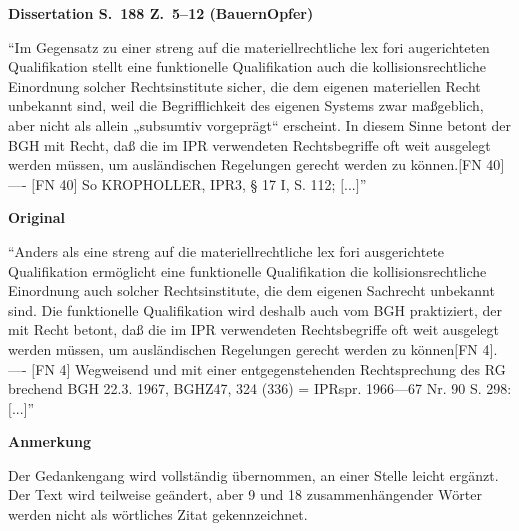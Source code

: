 \documentclass[ngerman,final,fontsize=12pt,paper=a4,twoside,bibliography=totocnumbered,BCOR=8mm,draft=false]{scrartcl}
\newenvironment{fragment}
	{\begin{snugshade}}
	{\end{snugshade}
	 \penalty-200
	 \vskip 0pt plus 10mm minus 5mm}
\newenvironment{fragmentpart}[1]
	{\noindent\textbf{#1}\par\penalty500}
	{\par}
\begin{document}
\hypertarget{Lm-Fragment-188-05}{}
\begin{fragment}
\begin{fragmentpart}{Dissertation S.~188 Z.~5--12 (BauernOpfer)}
\enquote{Im Gegensatz zu einer streng auf die materiellrechtliche lex fori augerichteten Qualifikation stellt eine funktionelle Qualifikation auch die kollisionsrechtliche Einordnung solcher Rechtsinstitute sicher, die dem eigenen materiellen Recht unbekannt sind, weil die Begrifflichkeit des eigenen Systems zwar maßgeblich, aber nicht als allein „subsumtiv vorgeprägt“ erscheint. In diesem Sinne betont der BGH mit Recht, daß die im IPR verwendeten Rechtsbegriffe oft weit ausgelegt werden müssen, um ausländischen Regelungen gerecht werden zu können.$[$FN 40$]$
----
$[$FN 40$]$ So KROPHOLLER, IPR3, § 17 I, S. 112; $[$...$]$}
\end{fragmentpart}
\begin{fragmentpart}{Original \cite[S.~112 Z.~6--12]{Kropholler-1997}}
\enquote{Anders als eine streng auf die materiellrechtliche lex fori ausgerichtete Qualifikation ermöglicht eine funktionelle Qualifikation die kollisionsrechtliche Einordnung auch solcher Rechtsinstitute, die dem eigenen Sachrecht unbekannt sind. Die funktionelle Qualifikation wird deshalb auch vom BGH praktiziert, der mit Recht betont, daß die im IPR verwendeten Rechtsbegriffe oft weit ausgelegt werden müssen, um ausländischen Regelungen gerecht werden zu können$[$FN 4$]$.
----
$[$FN 4$]$ Wegweisend und mit einer entgegenstehenden Rechtsprechung des RG brechend BGH 22.3. 1967, BGHZ47, 324 (336) = IPRspr. 1966—67 Nr. 90 S. 298: $[$...$]$}
\end{fragmentpart}
\begin{fragmentpart}{Anmerkung}
Der Gedankengang wird vollständig übernommen, an einer Stelle leicht ergänzt. Der Text wird teilweise geändert, aber 9 und 18 zusammenhängender Wörter werden nicht als wörtliches Zitat gekennzeichnet.
\end{fragmentpart}
\end{fragment}
\hypertarget{Lm-Fragment-193-02}{}
\end{document}
